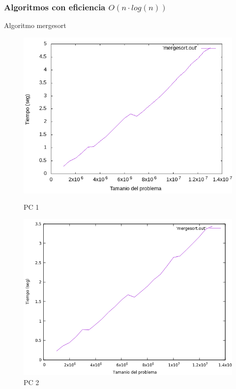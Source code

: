\documentclass{beamer}
\begin{document}
\subsubsection{Algoritmos con eficiencia $O(n \cdot log(n))$}

\begin{frame}[fragile]{Algoritmo mergesort}
\begin{figure}[H]
\centering
\begin{minipage}{.5\textwidth}
  \centering
  \includegraphics[width=\linewidth]{empirica_mergesort.png}
   \caption*{PC 1}
\end{minipage}%
\begin{minipage}{.5\textwidth}
  \centering
  \includegraphics[width=\linewidth]{empirica_mergesort_2.png}
  \caption*{PC 2}
\end{minipage}
\end{figure}
\end{frame}
\end{document}
